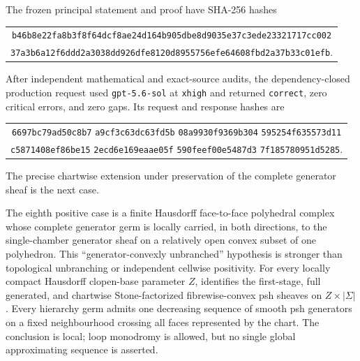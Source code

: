 The frozen principal statement and proof have SHA-256 hashes
\begin{center}
\small
\begin{tabular}{@{}c@{}}
\nolinkurl{b46b8e22fa8b3f8f64dcf8ae24d164b905dbe8d9035e37c3ede23321717cc002}\\
\nolinkurl{37a3b6a12f6ddd2a3038dd926dfe8120d8955756efe64608fbd2a37b33c01efb}.
\end{tabular}
\end{center}
After independent mathematical and exact-source audits, the
dependency-closed production request used \texttt{gpt-5.6-sol} at
\texttt{xhigh} and returned \texttt{correct}, zero critical errors, and
zero gaps.  Its request and response hashes are
\begin{center}
\small
\begin{tabular}{@{}c@{}}
\texttt{6697bc79ad50c8b7}\allowbreak
\texttt{a9cf3c63dc63fd5b}\allowbreak
\texttt{08a9930f9369b304}\allowbreak
\texttt{595254f635573d11}\\
\texttt{c5871408ef86be15}\allowbreak
\texttt{2ecd6e169eaae05f}\allowbreak
\texttt{590feef00e5487d3}\allowbreak
\texttt{7f185780951d5285}.
\end{tabular}
\end{center}
The precise chartwise extension under preservation of the complete
generator sheaf is the next case.

The eighth positive case is a finite Hausdorff face-to-face polyhedral
complex whose complete generator germ is locally carried, in both
directions, to the single-chamber generator sheaf on a relatively open
convex subset of one polyhedron.  This
``generator-convexly unbranched'' hypothesis is stronger than topological
unbranching or independent cellwise positivity.  For every locally compact
Hausdorff clopen-base parameter \(Z\),
 identifies the
first-stage, full generated, and chartwise Stone-factorized
fibrewise-convex psh sheaves on \(Z\times|\Sigma|\).  Every hierarchy germ
admits one decreasing sequence of smooth psh generators on a fixed
neighbourhood crossing all faces represented by the chart.  The conclusion
is local; loop monodromy is allowed, but no single global approximating
sequence is asserted.


